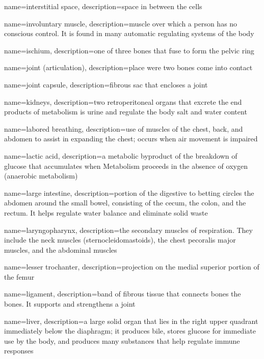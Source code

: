 \documentclass[../../EMT-169.tex]{subfiles}
\begin{document}
	{
		name=interstitial space,
		description={space in between the cells}
	}
	
	{
		name=involuntary muscle,
		description={muscle over which a person has no conscious control.  It is found in many automatic regulating systems of the body}
	}
	
	{
		name=ischium,
		description={one of three bones that fuse to form the pelvic ring}
	}

	{
		name=joint (articulation),
		description={place were two bones come into contact}
	}
	
	{
		name=joint capsule,
		description={fibrous sac that encloses a joint}
	}
	
	{
		name=kidneys,
		description={two retroperitoneal organs that excrete the end products of metabolism is urine and regulate the body salt and water content}
	}

	{
		name=labored breathing,
		description={use of muscles of the chest, back, and abdomen to assist in expanding the chest; occurs when air movement is impaired}
	}
	
	{
		name=lactic acid,
		description={a metabolic byproduct of the breakdown of glucose that accumulates when Metabolism proceeds in the absence of oxygen (anaerobic metabolism)}
	}
	
	{
		name=large intestine,
		description={portion of the digestive to betting circles the abdomen around the small bowel, consisting of the cecum, the colon, and the rectum. It helps regulate water balance and eliminate solid waste}
	}
		
	{
		name=laryngopharynx,
		description={the secondary muscles of respiration.  They include the neck muscles (sternocleidomastoids), the chest pecoralis major muscles, and the abdominal muscles}
	}

	{
		name=lesser trochanter,
		description={projection on the medial superior portion of the femur}
	}
	
	{
		name=ligament,
		description={band of fibrous tissue that connects bones the bones. It supports and strengthens a joint}
	}
	
	{
		name=liver,
		description={a large solid organ that lies in the right upper quadrant immediately below the diaphragm; it produces bile, stores glucose for immediate use by the body, and produces many substances that help regulate immune responses}
	}
	
\end{document}

